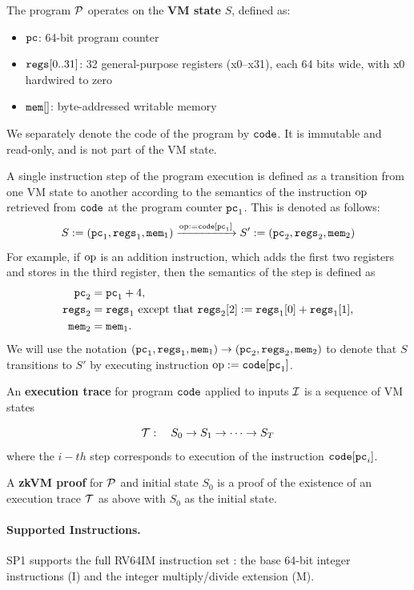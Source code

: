 \documentclass[11pt]{article}
\begin{document}
The program $\mathcal{P}$ operates on the \textbf{VM state} $S$, defined as:
\begin{itemize}
\item $\mathtt{pc}$: 64-bit program counter
\item $\mathtt{regs}[0..31]$: 32 general-purpose registers (x0--x31), each 64 bits wide,
      with x0 hardwired to zero
\item $\mathtt{mem}[]$: byte-addressed writable memory
\end{itemize}
We separately denote the code of the program by $\mathtt{code}$. It is immutable and read-only, and is not part of the VM state.

A single instruction step of the program execution is defined as a transition from
one VM state to another according to the semantics of the instruction $\mathrm{op}$ retrieved from
$\mathtt{code}$ at the program counter $\mathtt{pc}_1$. This is denoted as follows:
\begin{equation}\label{eq:op}
S:=(\mathtt{pc}_1,\mathtt{regs}_1,\mathtt{mem}_1)\xrightarrow{\mathrm{op}:=\mathtt{code}[\mathtt{pc}_1]} S':=(\mathtt{pc}_2,\mathtt{regs}_2,\mathtt{mem}_2)
\end{equation}
For example, if $\mathrm{op}$ is an addition instruction, which adds the first two registers and stores in the third register, then the semantics of the step is defined as
\begin{align}
\mathtt{pc}_2&=\mathtt{pc}_1+4,\\
\mathtt{regs}_2&=\mathtt{regs}_1\text{ except that } \mathtt{regs}_2[2]:=\mathtt{regs}_1[0]+\mathtt{regs}_1[1],\\
\mathtt{mem}_2&=\mathtt{mem}_1.
\end{align}
We will use the notation $(\mathtt{pc}_1,\mathtt{regs}_1,\mathtt{mem}_1)\rightarrow  (\mathtt{pc}_2,\mathtt{regs}_2,\mathtt{mem}_2)$ to denote that $S$ transitions to $S'$ by executing instruction
 $\mathrm{op}:=\mathtt{code}[\mathtt{pc}_1]$.


An \textbf{execution trace} for program $\mathtt{code}$ applied to inputs $\mathcal{I}$ is a sequence of VM states

\[
\mathcal{T}:\quad S_0 \rightarrow S_1 \rightarrow \cdots \rightarrow S_T
\]
where the $i-th$ step corresponds to execution of the instruction $\mathtt{code}[\mathtt{pc}_i]$.


A \textbf{zkVM proof} for $\mathcal{P}$ and initial state $S_0$ is a proof of the existence of an execution
trace $\mathcal{T}$ as above with $S_0$ as the initial state.

\paragraph{Supported Instructions.}
SP1 supports the full RV64IM instruction
set \cite{riscv}:
the base 64-bit integer instructions (I) and the integer
multiply/divide extension (M).
\end{document}
